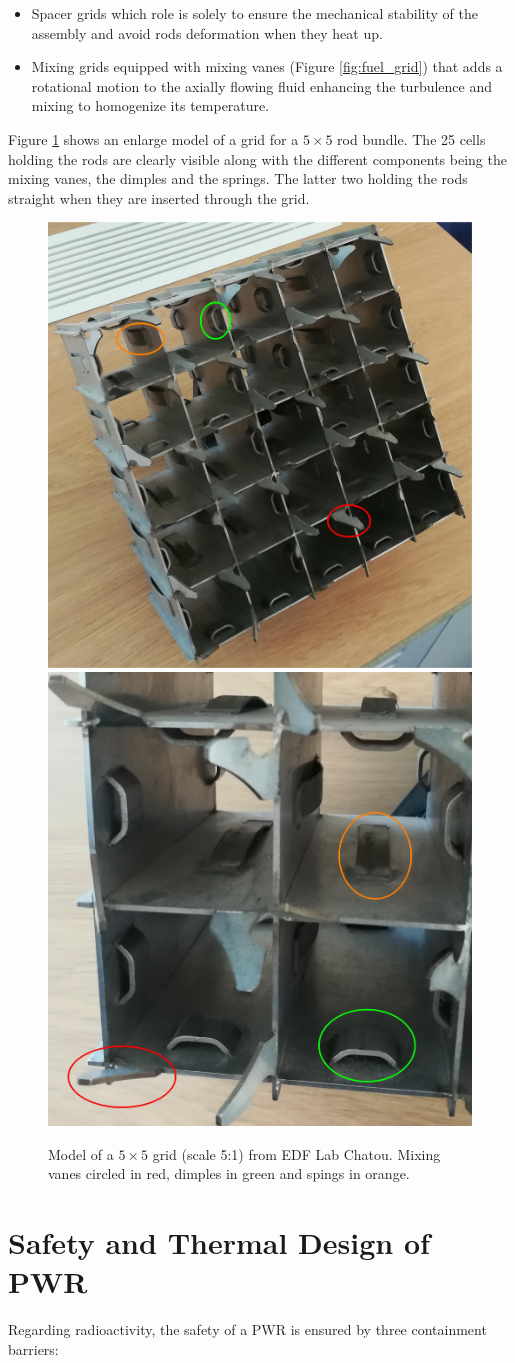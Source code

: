 \begin{itemize}
\item Spacer grids which role is solely to ensure the mechanical stability of the assembly and avoid rods deformation when they heat up.
\item Mixing grids equipped with mixing vanes (Figure \ref{fig:fuel_grid}) that adds a rotational motion to the axially flowing fluid enhancing the turbulence and mixing to homogenize its temperature.
\end{itemize}

Figure \ref{fig:fuel_grid_I8C} shows an enlarge model of a grid for a $5 \times 5$ rod bundle. The 25 cells holding the rods are clearly visible along with the different components being the mixing vanes, the dimples and the springs. The latter two holding the rods straight when they are inserted through the grid.


\begin{figure}[!h]
\centering
\includegraphics[width=0.3\linewidth]{img/intro/MaquetteGrille.png}
\includegraphics[width=0.3\linewidth]{img/intro/CanauxGrille.jpg}
\caption{Model of a $5 \times 5$ grid (scale 5:1) from EDF Lab Chatou. Mixing vanes circled in red, dimples in green and spings in orange.}
\label{fig:fuel_grid_I8C}
\end{figure}

\npar

\section{Safety and Thermal Design of PWR}

Regarding radioactivity, the safety of a PWR is ensured by three containment barriers:

